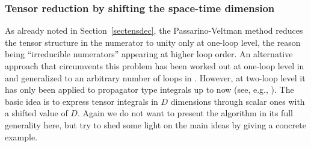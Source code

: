 

\subsubsection{Tensor reduction by shifting the space-time dimension
  \label{sec::tredtar}}
%
As already noted in Section~\ref{sectensdec}, the Passarino-Veltman
method reduces the tensor structure in the numerator to unity only at
one-loop level, the reason being ``irreducible numerators'' appearing at
higher loop order. An alternative approach that circumvents this problem
has been worked out at one-loop level in \cite{Dav91} and generalized to
an arbitrary number of loops in \cite{Tar96,Tar97}. However, at two-loop
level it has only been applied to propagator type integrals up to now
(see, e.g., \cite{FleJegTarVer99}).
The basic idea is to express tensor integrals in $D$ dimensions through
scalar ones with a shifted value of $D$.  Again we do not want to
present the algorithm in its full generality here, but try to shed some
light on the main ideas by giving a concrete example.

